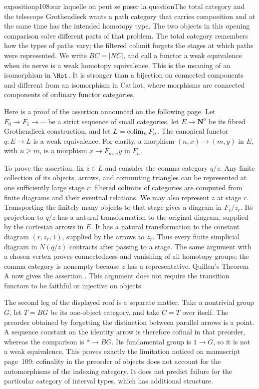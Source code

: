 \begin{dcomment}{exposition}{p108:sur laquelle on peut se poser la question}{The total category and the telescope}
Grothendieck wants a path category that carries composition and at the same time has the intended homotopy type. The two objects in this opening comparison solve different parts of that problem. The total category remembers how the types of paths vary; the filtered colimit forgets the stages at which paths were represented. We write $BC=|NC|$, and call a functor a weak equivalence when its nerve is a weak homotopy equivalence. This is the meaning of an isomorphism in $\Hot$. It is stronger than a bijection on connected components and different from an isomorphism in $\mathrm{Cat\,hot}$, where morphisms are connected components of ordinary functor categories.

Here is a proof of the assertion announced on the following page. Let $F_0\to F_1\to\cdots$ be a strict sequence of small categories, let $E\to\mathbf N^o$ be its fibred Grothendieck construction, and let $L=\mathop{\rm colim}_nF_n$. The canonical functor $q:E\to L$ is a weak equivalence. For clarity, a morphism $(n,x)\to(m,y)$ in $E$, with $n\geq m$, is a morphism $x\to F_{m,n}y$ in $F_n$.

To prove the assertion, fix $z\in L$ and consider the comma category $q/z$. Any finite collection of its objects, arrows, and commuting triangles can be represented at one sufficiently large stage $r$: filtered colimits of categories are computed from finite diagrams and their eventual relations. We may also represent $z$ at stage $r$. Transporting the finitely many objects to that stage gives a diagram in $F_r/z_r$. Its projection to $q/z$ has a natural transformation to the original diagram, supplied by the cartesian arrows in $E$. It has a natural transformation to the constant diagram $(r,z_r,1)$, supplied by the arrows to $z_r$. Thus every finite simplicial diagram in $N(q/z)$ contracts after passing to a stage. The same argument with a chosen vertex proves connectedness and vanishing of all homotopy groups; the comma category is nonempty because $z$ has a representative. Quillen's Theorem A now gives the assertion \citep[\S1, Theorem A]{Quillen1973}. This argument does not require the transition functors to be faithful or injective on objects.

The second leg of the displayed roof is a separate matter. Take a nontrivial group $G$, let $T=BG$ be its one-object category, and take $C=T$ over itself. The preorder obtained by forgetting the distinction between parallel arrows is a point. A sequence constant on the identity arrow is therefore cofinal in that preorder, whereas the comparison is $*\to BG$. Its fundamental group is $1\to G$, so it is not a weak equivalence. This proves exactly the limitation noticed on manuscript page~109: cofinality in the preorder of objects does not account for the automorphisms of the indexing category. It does not predict failure for the particular category of interval types, which has additional structure.
\end{dcomment}


